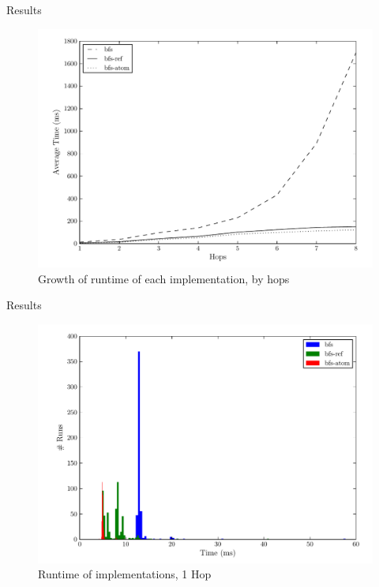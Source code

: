 \documentclass[compress]{beamer}
\begin{document}
		\begin{frame}{Results}
			\begin{figure}
				\centering
				\includegraphics[scale=0.5]{../document/figures/charts/growth}
				\caption{Growth of runtime of each implementation, by hops}
			\end{figure}
		\end{frame}
		
		\begin{frame}{Results}
			\begin{figure}
				\centering
				\includegraphics[scale=0.5]{../document/figures/charts/1_hops}
				\caption{Runtime of implementations, 1 Hop}
			\end{figure}
		\end{frame}
		
\end{document}
